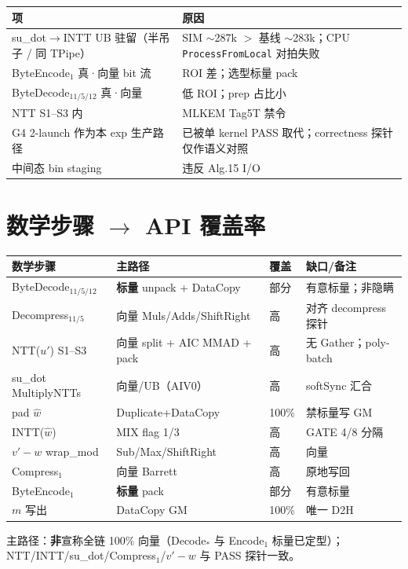 \documentclass[UTF8,a4paper,11pt]{ctexart}
\newcommand{\apiname}[1]{\texttt{\seqsplit{#1}}}
\begin{document}
\begin{longtable}{@{}L{4.5cm}L{8.5cm}@{}}
\toprule
项 & 原因 \\
\midrule
su\_dot$\to$INTT UB 驻留（半吊子 / 同 TPipe） & SIM $\sim$287k $>$ 基线 $\sim$283k；CPU \texttt{ProcessFromLocal} 对拍失败 \\
ByteEncode$_1$ 真·向量 bit 流 & ROI 差；选型标量 pack \\
ByteDecode$_{11/5/12}$ 真·向量 & 低 ROI；prep 占比小 \\
NTT S1--S3 内 \apiname{Gather} & MLKEM Tag5T 禁令 \\
G4 2-launch 作为本 exp 生产路径 & 已被单 kernel PASS 取代；correctness 探针仅作语义对照 \\
中间态 bin staging & 违反 Alg.15 I/O \\
\bottomrule
\end{longtable}

\section{数学步骤 $\to$ API 覆盖率}
\label{sec:coverage}

\begin{longtable}{@{}L{4.2cm}L{4.0cm}L{1.5cm}L{3.5cm}@{}}
\toprule
数学步骤 & 主路径 & 覆盖 & 缺口/备注 \\
\midrule
ByteDecode$_{11/5/12}$ & \textbf{标量} unpack + DataCopy & 部分 & 有意标量；非隐瞒 \\
Decompress$_{11/5}$ & 向量 Muls/Adds/ShiftRight & 高 & 对齐 decompress 探针 \\
NTT($u'$) S1--S3 & 向量 split + AIC MMAD + pack & 高 & 无 Gather；poly-batch \\
su\_dot MultiplyNTTs & 向量/UB（AIV0） & 高 & softSync 汇合 \\
pad $\hat{w}$ & Duplicate+DataCopy & 100\% & 禁标量写 GM \\
INTT($\hat{w}$) & MIX flag 1/3 & 高 & GATE 4/8 分隔 \\
$v'-w$ wrap\_mod & Sub/Max/ShiftRight & 高 & 向量 \\
Compress$_1$ & 向量 Barrett & 高 & 原地写回 \\
ByteEncode$_1$ & \textbf{标量} pack & 部分 & 有意标量 \\
$m$ 写出 & DataCopy GM & 100\% & 唯一 D2H \\
\bottomrule
\end{longtable}

主路径：\textbf{非}宣称全链 100\% 向量（Decode$_{*}$ 与 Encode$_1$ 标量已定型）；NTT/INTT/su\_dot/Compress$_1$/$v'-w$ 与 PASS 探针一致。
\end{document}
